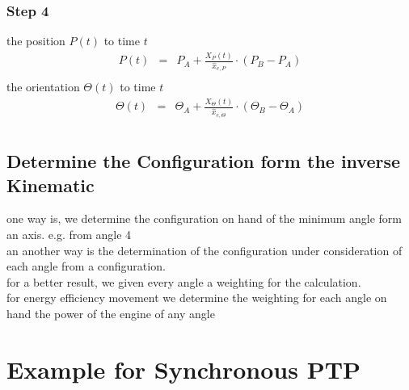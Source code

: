\documentclass[professionalfonts, 
               xcolor={ usenames, %
                        dvipsnames,%
                        svgnames,%
                        table,%
                        hyperref%
                      }
              ]{beamer}
\begin{document}
\subsubsection{Step 4}
\begin{frame}
the position $P(t)$ to time $t$
\begin{eqnarray*}
P(t) & = & P_{A} + \frac{X_{P}(t)}{\hat{x}_{e,P}} \cdot \left(P_{B} - P_{A} \right)\\
\end{eqnarray*}
the orientation $\Theta(t)$ to time $t$
\begin{eqnarray*}
\Theta(t) & = & \Theta_{A} + \frac{X_{\Theta}(t)}{\hat{x}_{e,\Theta}} \cdot \left(\Theta_{B} - \Theta_{A} \right)\\
\end{eqnarray*}
\end{frame}


\subsection{Determine the Configuration form the inverse Kinematic}
\begin{frame}
one way is, we determine the configuration on hand of the minimum angle form an axis. e.g. from angle 4 \\


an another way is the determination of the configuration under consideration of each angle from a configuration.\\
for a better result, we given every angle a weighting for the calculation.\\
for energy efficiency movement we determine the weighting for each angle on hand the power of the engine of any angle\\

\end{frame}

\section{Example for Synchronous PTP} 
\end{document}
